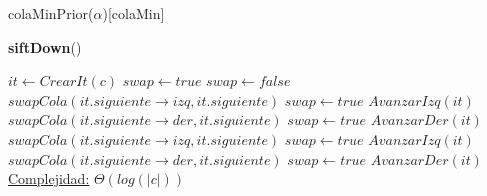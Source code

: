 \begin{Estructura}{colaMinPrior($\alpha$)}[colaMin]
\begin{algorithm}[H]{\textbf{siftDown}()}
    	\begin{algorithmic}[1]
			\State $it \leftarrow CrearIt(c)$ 
			\State $swap \leftarrow true$
			 
				\State $swap \leftarrow false$ 
				 
					 					
						 
							\State $swapCola(it.siguiente \rightarrow izq, it.siguiente) $ 
							\State $swap \leftarrow true$ 							
							\State $AvanzarIzq(it) $ 							
						\EndIf
					\Else
						 
							\State $swapCola(it.siguiente \rightarrow der, it.siguiente) $ 
							\State $swap \leftarrow true$ 							
							\State $AvanzarDer(it) $ 							
						\EndIf
					\EndIf
				\Else
					 
						 
							\State $swapCola(it.siguiente \rightarrow izq, it.siguiente) $ 
							\State $swap \leftarrow true$ 							
							\State $AvanzarIzq(it) $ 							
						\EndIf
					\Else
						 
							\State $swapCola(it.siguiente \rightarrow der, it.siguiente) $ 
							\State $swap \leftarrow true$ 							
							\State $AvanzarDer(it) $ 							
						\EndIf
					\EndIf
				\EndIf
			\EndWhile
			\medskip
			\Statex \underline{Complejidad:} $\Theta(log(|c|))$
    	\end{algorithmic}
\end{algorithm}


\end{Estructura}
